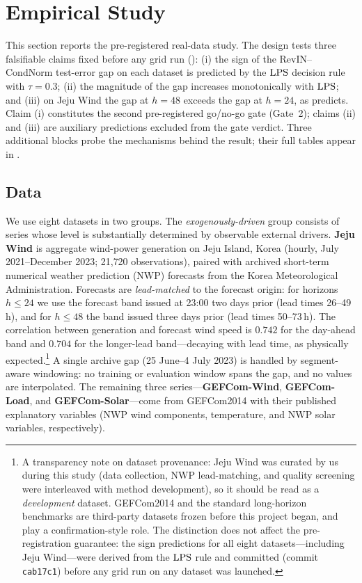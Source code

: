 \section{Empirical Study}\label{sec:empirical}

This section reports the pre-registered real-data study. The design tests three falsifiable claims fixed before any grid run (): (i) the sign of the RevIN--CondNorm test-error gap on each dataset is predicted by the $\mathrm{LPS}$ decision rule with $\tau=0.3$; (ii) the magnitude of the gap increases monotonically with $\mathrm{LPS}$; and (iii) on Jeju Wind the gap at $h=48$ exceeds the gap at $h=24$, as  predicts. Claim (i) constitutes the second pre-registered go/no-go gate (Gate~2); claims (ii) and (iii) are auxiliary predictions excluded from the gate verdict. Three additional blocks probe the mechanisms behind the result; their full tables appear in .

\subsection{Data}

We use eight datasets in two groups. The \emph{exogenously-driven} group consists of series whose level is substantially determined by observable external drivers. \textbf{Jeju Wind} is aggregate wind-power generation on Jeju Island, Korea (hourly, July 2021--December 2023; 21{,}720 observations), paired with archived short-term numerical weather prediction (NWP) forecasts from the Korea Meteorological Administration. Forecasts are \emph{lead-matched} to the forecast origin: for horizons $h\le 24$ we use the forecast band issued at 23:00 two days prior (lead times 26--49\,h), and for $h\le 48$ the band issued three days prior (lead times 50--73\,h). The correlation between generation and forecast wind speed is $0.742$ for the day-ahead band and $0.704$ for the longer-lead band---decaying with lead time, as physically expected.\footnote{A transparency
note on dataset provenance: Jeju Wind was curated by us during this study
(data collection, NWP lead-matching, and quality screening were interleaved
with method development), so it should be read as a \emph{development}
dataset. GEFCom2014 and the standard long-horizon benchmarks are third-party
datasets frozen before this project began, and play a confirmation-style
role. The distinction does not affect the pre-registration guarantee: the
sign predictions for all eight datasets---including Jeju Wind---were derived
from the $\mathrm{LPS}$ rule and committed (commit \texttt{cab17c1}) before any grid
run on any dataset was launched.} A single archive gap (25 June--4 July 2023) is handled by segment-aware windowing: no training or evaluation window spans the gap, and no values are interpolated. The remaining three series---\textbf{GEFCom-Wind}, \textbf{GEFCom-Load}, and \textbf{GEFCom-Solar}---come from GEFCom2014 \citep{hong2016gefcom} with their published explanatory variables (NWP wind components, temperature, and NWP solar variables, respectively).

